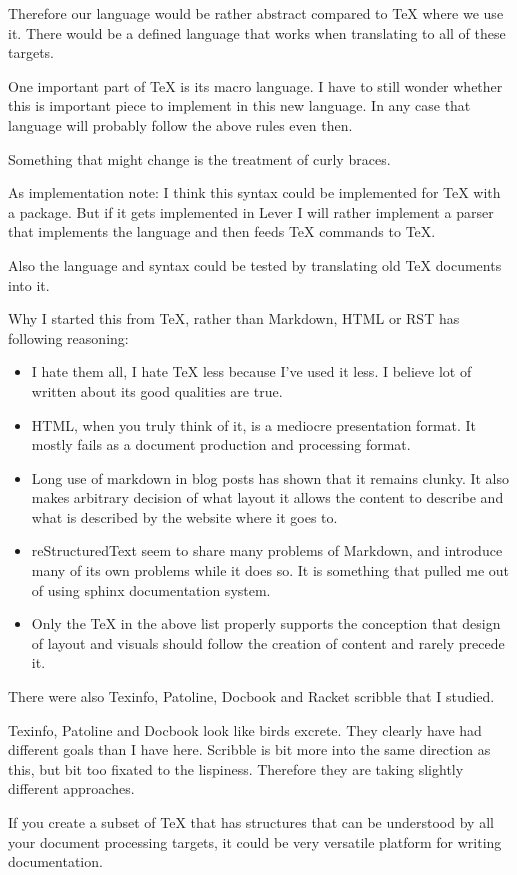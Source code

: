 \documentclass{article}
\begin{document}
Therefore our language would be rather abstract compared to
TeX where we use it. There would be a defined language that
works when translating to all of these targets.

One important part of TeX is its macro language. I have to
still wonder whether this is important piece to implement in
this new language. In any case that language will probably
follow the above rules even then.

Something that might change is the treatment of curly braces.

As implementation note:
I think this syntax could be implemented for TeX with a
package. But if it gets implemented in Lever I will rather
implement a parser that implements the language and then
feeds TeX commands to TeX.

Also the language and syntax could be tested by translating
old TeX documents into it.

Why I started this from TeX, rather than Markdown, HTML or
RST has following reasoning:

\begin{itemize}
    \item
        I hate them all, I hate TeX less because I've used
        it less. I believe lot of written about its good
        qualities are true.
    \item
        HTML, when you truly think of it, is a mediocre
        presentation format. It mostly fails as a
        document production and processing format.
    \item
        Long use of markdown in blog posts has shown that it
        remains clunky. It also makes arbitrary decision of
        what layout it allows the content to describe and
        what is described by the website where it goes to.
    \item
        reStructuredText seem to share many problems of
        Markdown, and introduce many of its own problems
        while it does so. It is something that pulled me out
        of using sphinx documentation system.
    \item
        Only the TeX in the above list properly supports the
        conception that design of layout and visuals should
        follow the creation of content and rarely precede it.
\end{itemize}

There were also Texinfo, Patoline, Docbook and Racket scribble
that I studied.

Texinfo, Patoline and Docbook look like birds excrete. They
clearly have had different goals than I have here. Scribble
is bit more into the same direction as this, but bit too
fixated to the lispiness. Therefore they are taking slightly
different approaches.

If you create a subset of TeX that has structures that can
be understood by all your document processing targets, it
could be very versatile platform for writing documentation.
\end{document}
